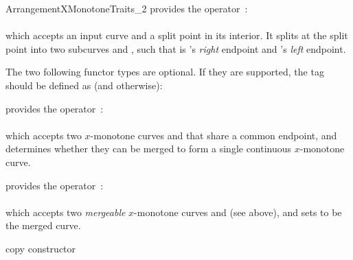 \begin{ccRefConcept}{ArrangementXMonotoneTraits_2}
{provides the operator~: \\
  \\
 which accepts an input curve  and a split point  in its
 interior. It splits  at the split point into two subcurves 
 and , such that  is 's {\sl right} endpoint and
 's {\sl left} endpoint.} 

The two following functor types are optional. If they are supported, the
 tag should be defined as  (and
 otherwise):

{provides the operator~: \\
  \\
 which accepts two $x$-monotone curves  and  that share
 a common endpoint, and determines whether they can be merged to form a single
 continuous $x$-monotone curve.}

{provides the operator~: \\
  \\
 which accepts two {\sl mergeable} $x$-monotone curves  and 
 (see above), and sets  to be the merged curve.} 

\ccCreation
{}

\ccThreeToTwo

\ccGlue
{}
{copy constructor}
\ccGlue
{}



 {}
\ccGlue
{} {}
\ccGlue
{} {}
\ccGlue
{} {}

\ccHasModels


\end{ccRefConcept}
